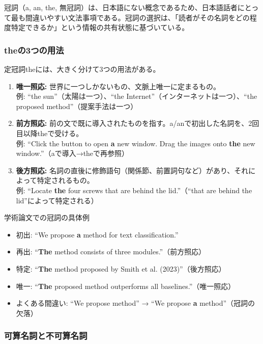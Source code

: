 冠詞（a, an, the, 無冠詞）は、日本語にない概念であるため、日本語話者にとって最も間違いやすい文法事項である。冠詞の選択は、「読者がその名詞をどの程度特定できるか」という情報の共有状態に基づいている。

\subsubsection{theの3つの用法}

定冠詞theには、大きく分けて3つの用法がある。

\begin{enumerate}
\item \textbf{唯一照応:} 世界に一つしかないもの、文脈上唯一に定まるもの。\\
例: ``the sun''（太陽は一つ）、``the Internet''（インターネットは一つ）、``the proposed method''（提案手法は一つ）
\item \textbf{前方照応:} 前の文で既に導入されたものを指す。a/anで初出した名詞を、2回目以降theで受ける。\\
例: ``Click the button to open \textbf{a} new window. Drag the images onto \textbf{the} new window.''（aで導入→theで再参照）
\item \textbf{後方照応:} 名詞の直後に修飾語句（関係節、前置詞句など）があり、それによって特定されるもの。\\
例: ``Locate \textbf{the} four screws that are behind the lid.''（``that are behind the lid''によって特定される）
\end{enumerate}

\begin{itembox}[l]{学術論文での冠詞の具体例}
\begin{itemize}
\item 初出: ``We propose \textbf{a} method for text classification.''
\item 再出: ``\textbf{The} method consists of three modules.''（前方照応）
\item 特定: ``\textbf{The} method proposed by Smith et al. (2023)''（後方照応）
\item 唯一: ``\textbf{The} proposed method outperforms all baselines.''（唯一照応）
\item よくある間違い: ``We propose method'' → ``We propose \textbf{a} method''（冠詞の欠落）
\end{itemize}
\end{itembox}

\subsubsection{可算名詞と不可算名詞}

